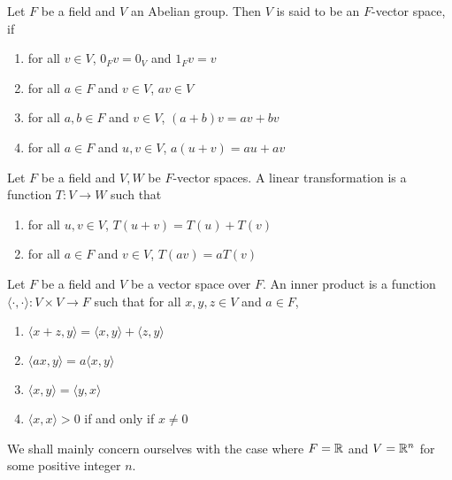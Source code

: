 \begin{definition}
    Let $F$ be a field and $V$ an Abelian group. Then $V$ is said to be an $F$-vector space, if 
    \begin{enumerate}
        \item for all $v\in V$, $0_Fv = 0_V$ and $1_Fv = v$
        \item for all $a\in F$ and $v\in V$, $av\in V$
        \item for all $a,b\in F$ and $v\in V$, $(a + b)v = av + bv$
        \item for all $a\in F$ and $u,v\in V$, $a(u + v) = au + av$
    \end{enumerate}
\end{definition}

\begin{definition}
    Let $F$ be a field and $V,W$ be $F$-vector spaces. A linear transformation is a function $T:V\to W$ such that 
    \begin{enumerate}
        \item for all $u,v\in V$, $T(u + v) = T(u) + T(v)$ 
        \item for all $a\in F$ and $v\in V$, $T(av) = aT(v)$
    \end{enumerate}
\end{definition}

\begin{definition}
    Let $F$ be a field and $V$ be a vector space over $F$. An inner product is a function $\langle\cdot,\cdot\rangle:V\times V\to F$ such that for all $x,y,z\in V$ and $a\in F$,
    \begin{enumerate}
        \item $\langle x + z, y\rangle = \langle x,y\rangle + \langle z,y\rangle$ 
        \item $\langle ax,y\rangle = a\langle x,y\rangle$ 
        \item $\langle x,y\rangle = \langle y,x\rangle$ 
        \item $\langle x,x\rangle > 0$ if and only if $x\ne 0$
    \end{enumerate}
\end{definition}

We shall mainly concern ourselves with the case where $F = \mathbb{R}$ and $V = \mathbb{R}^n$ for some positive integer $n$.

